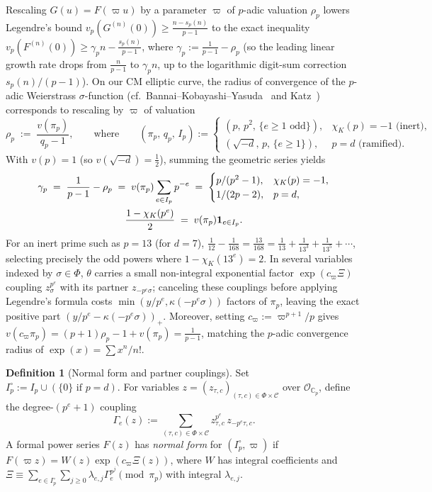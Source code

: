 \documentclass[11pt]{amsart}
\newcommand{\CC}{\mathbb{C}}
\theoremstyle{definition}
\newtheorem{definition}[theorem]{Definition}
\theoremstyle{remark}
\begin{document}
Rescaling $G(u)=F(\varpi u)$ by a parameter $\varpi$ of $p$-adic valuation $\rho_p$ lowers Legendre's bound $v_p(G^{(n)}(0))\ge\frac{n-s_p(n)}{p-1}$ to the exact inequality $v_p(F^{(n)}(0))\ge\gamma_p n-\frac{s_p(n)}{p-1}$, where $\gamma_p:=\frac{1}{p-1}-\rho_p$ (so the leading linear growth rate drops from $\frac{n}{p-1}$ to $\gamma_p n$, up to the logarithmic digit-sum correction $s_p(n)/(p-1)$). On our CM elliptic curve, the radius of convergence of the $p$-adic Weierstrass $\sigma$-function (cf.\ Bannai--Kobayashi--Yasuda~\cite{BKY} and Katz~\cite{Katz81}) corresponds to rescaling by $\varpi$ of valuation
\[
 \rho_p \;:=\; \frac{v(\pi_p)}{q_p-1},
 \qquad\text{where}\qquad
 (\pi_p,\,q_p,\,I_p) := \begin{cases}
  (p,\,p^2,\,\{e\ge 1\text{ odd}\}), & \chi_K(p)=-1\text{ (inert)},\\
  (\sqrt{-d},\,p,\,\{e\ge 1\}), & p=d\text{ (ramified)}.
 \end{cases}
\]
With $v(p)=1$ (so $v(\sqrt{-d})=\frac12$), summing the geometric series yields
\begin{gather}\label{eq:gammap}
 \gamma_p \;=\; \frac{1}{p-1}-\rho_p \;=\; v(\pi_p)\sum_{e\in I_p}p^{-e}
 \;=\; \begin{cases} p/(p^2-1),&\chi_K(p)=-1,\\ 1/(2p-2),&p=d,\end{cases}\\
 \frac{1-\chi_K(p^e)}{2} \;=\; v(\pi_p)\mathbf{1}_{e\in I_p}.\notag
\end{gather}
For an inert prime such as $p=13$ (for $d=7$), $\frac{1}{12}-\frac{1}{168}=\frac{13}{168}=\frac{1}{13}+\frac{1}{13^3}+\frac{1}{13^5}+\cdots$, selecting precisely the odd powers where $1-\chi_K(13^e)=2$. In several variables indexed by $\sigma\in\Phi$, $\theta$ carries a small non-integral exponential factor $\exp(c_\varpi\Xi)$ coupling $z_\sigma^{p^e}$ with its partner $z_{-p^e\sigma}$; canceling these couplings before applying Legendre's formula costs $\min(y/p^e,\kappa(-p^e\sigma))$ factors of $\pi_p$, leaving the exact positive part $(y/p^e-\kappa(-p^e\sigma))_+$. Moreover, setting $c_\varpi:=\varpi^{p+1}/p$ gives $v(c_\varpi\pi_p)=(p+1)\rho_p-1+v(\pi_p)=\frac{1}{p-1}$, matching the $p$-adic convergence radius of $\exp(x)=\sum x^n/n!$.

\begin{definition}[Normal form and partner couplings]\label{def:normal_form}
Set $I_p^\circ:=I_p\cup(\{0\}\text{ if }p=d)$. For variables $z=(z_{\tau,c})_{(\tau,c)\in\Phi\times\mathcal{C}}$ over $\mathcal{O}_{\CC_p}$, define the degree-$(p^e+1)$ coupling
\[
 \Gamma_e(z) := \sum_{(\tau,c)\in\Phi\times\mathcal{C}} z_{\tau,c}^{p^e}\,z_{-p^e\tau,c}.
\]
A formal power series $F(z)$ has \emph{normal form} for $(I_p^\circ,\varpi)$ if $F(\varpi z)=W(z)\exp(c_\varpi\Xi(z))$, where $W$ has integral coefficients and $\Xi\equiv\sum_{e\in I_p^\circ}\sum_{j\ge 0}\lambda_{e,j}\Gamma_e^{p^j}\pmod{\pi_p}$ with integral $\lambda_{e,j}$.
\end{definition}
\end{document}
